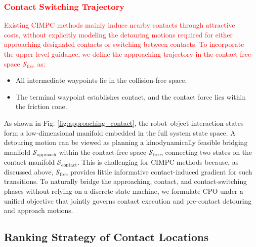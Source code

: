 \subsubsection{\textcolor{red}{Contact Switching Trajectory}}\label{sec:feasible_contact_trajectory}

\textcolor{red}{Existing CIMPC methods mainly induce nearby contacts through attractive costs, without explicitly modeling the detouring motions required for either approaching designated contacts or switching between contacts. To incorporate the upper-level guidance, we define the approaching trajectory in the contact-free space $\mathcal{S}_{\mathrm{free}}$ as:}
\begin{itemize}
\item All intermediate waypoints lie in the collision-free space.
\item The terminal waypoint establishes contact, and the contact force lies within the friction cone.
\end{itemize}

As shown in Fig. \ref{fig:approaching_contact}, the robot--object interaction states form a low-dimensional manifold embedded in the full system state space. A detouring motion can be viewed as planning a kinodynamically feasible bridging manifold $\mathcal{S}_{\text{approach}}$ within the contact-free space $\mathcal{S}_{\text{free}}$, connecting two states on the contact manifold $\mathcal{S}_{\text{contact}}$. This is challenging for CIMPC methods because, as discussed above, $\mathcal{S}_{\text{free}}$ provides little informative contact-induced gradient for such transitions. To naturally bridge the approaching, contact, and contact-switching phases without relying on a discrete state machine, we formulate CPO under a unified objective that jointly governs contact execution and pre-contact detouring and approach motions.

\subsection{Ranking Strategy of Contact Locations}
\label{sec:cpo-ranking_strategy}

